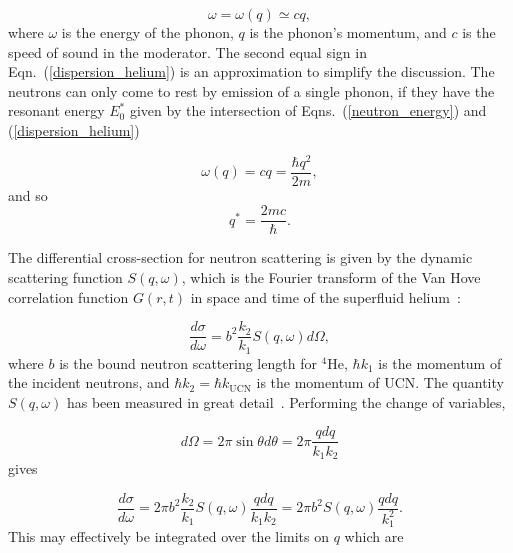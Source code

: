 \begin{equation}
\label{dispersion_helium}
\omega=\omega(q) \simeq cq,
\end{equation}
where $\omega$ is the energy of the phonon, $q$ is the phonon's
momentum, and $c$ is the speed of sound in the moderator. The second
equal sign in Eqn.~(\ref{dispersion_helium}) is an approximation to
simplify the discussion. The neutrons can only come to rest by
emission of a single phonon, if they have the resonant energy $E_0^*$
given by the intersection of Eqns.~(\ref{neutron_energy}) and
(\ref{dispersion_helium})

\begin{equation}
\omega(q)=cq=\frac{\hbar q^2}{2m},
\end{equation}
and so
\begin{equation}
q^*=\frac{2mc}{\hbar}.
\end{equation}


The differential cross-section for neutron scattering is given by the
dynamic scattering function $S(q,\omega)$, which is the Fourier
transform of the Van Hove correlation function $G(r,t)$ in space and
time of the superfluid helium~\cite{Squires}:

\begin{equation}
\frac{d\sigma}{d\omega}=b^2 \frac{k_2}{k_1}S(q,\omega) d\Omega,
\end{equation}
where $b$ is the bound neutron scattering length for $^4$He,
$\hbar k_1$ is the momentum of the incident neutrons, and
$\hbar k_2=\hbar k_{\text{UCN}}$ is the momentum of UCN. The quantity
$S(q,\omega)$ has been measured in great
detail~\cite{S_func1,gibbs1999collective,S_func3}. Performing the
change of variables,

\begin{equation}
d\Omega=2 \pi \sin \theta d \theta = 2 \pi \frac{q dq}{k_1 k_2}
\end{equation}
gives

\begin{equation}
 \frac{d\sigma}{d\omega}=2\pi b^2 \frac{k_2}{k_1}S(q,\omega)\frac{q
   dq}{k_1 k_2}=2\pi b^2 S(q,\omega)\frac{q dq}{k_1^2}.
\end{equation}
This may effectively be integrated over the limits on $q$ which are

